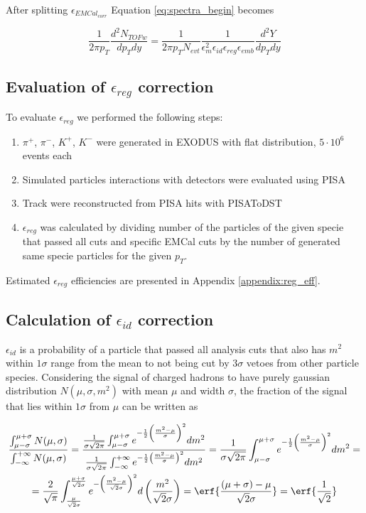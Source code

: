 After splitting $\epsilon_{EMCal_{corr}}$ Equation \ref{eq:spectra_begin} becomes

\begin{equation}
	\frac{1}{2\pi p_T}\frac{d^2N_{TOFw}}{dp_T dy} = \frac{1}{2 \pi p_T N_{evt}}\frac{1}{\epsilon_m^{2}\epsilon_{id}\epsilon_{reg}\epsilon_{emb}}\frac{d^2Y}{dp_T dy}
	\label{eq:spectra}
\end{equation}

\subsection{Evaluation of $\epsilon_{reg}$ correction}

To evaluate $\epsilon_{reg}$ we performed the following steps:
\begin{enumerate}
	\item $\pi^+$, $\pi^-$, $K^+$, $K^-$ were generated in EXODUS with flat distribution, $5 \cdot 10^6$ events each
	\item Simulated particles interactions with detectors were evaluated using PISA
	\item Track were reconstructed from PISA hits with PISAToDST
	\item $\epsilon_{reg}$ was calculated by dividing number of the particles of the given specie that passed all cuts and specific EMCal cuts by the number of generated same specie particles for the given $p_T$.
\end{enumerate}

Estimated $\epsilon_{reg}$ efficiencies are presented in Appendix \ref{appendix:reg_eff}.

\subsection{Calculation of $\epsilon_{id}$ correction}

$\epsilon_{id}$ is a probability of a particle that passed all analysis cuts that also has $m^2$ within $1\sigma$ range from the mean to not being cut by $3\sigma$ vetoes from other particle species. Considering the signal of charged hadrons to have purely gaussian distribution $N(\mu, \sigma, m^2)$ with mean $\mu$ and width $\sigma$, the fraction of the signal that lies within $1\sigma$ from $\mu$ can be written as

\begin{multline}
	\frac{\int_{\mu - \sigma}^{\mu + \sigma} N(\mu, \sigma)}{\int_{-\infty}^{+\infty} N(\mu, \sigma)} = 
	\frac{\frac{1}{\sigma \sqrt{2 \pi}} \int_{\mu - \sigma}^{\mu + \sigma} e^{-\frac{1}{2} \left( \frac{m^2-\mu}{\sigma} \right)^2} dm^2}
	{\frac{1}{\sigma \sqrt{2 \pi}} \int_{-\infty}^{+\infty} e^{-\frac{1}{2} \left( \frac{m^2-\mu}{\sigma} \right)^2} dm^2} = 
	\frac{1}{\sigma \sqrt{2 \pi}}\int_{\mu - \sigma}^{\mu + \sigma} e^{-\frac{1}{2} \left( \frac{m^2-\mu}{\sigma} \right)^2} d m^2 = \\
	= \frac{2}{\sqrt{\pi}}\int_{\frac{\mu}{\sqrt{2}\sigma}}^{\frac{\mu + \sigma}{\sqrt{2}\sigma}} e^{-\left( \frac{m^2-\mu}{\sqrt{2}\sigma} \right)^2} d \left( \frac{m^2}{\sqrt{2}\sigma} \right) = 
	\erf{\frac{(\mu + \sigma) - \mu}{\sqrt{2}\sigma}} = \erf{\frac{1}{\sqrt{2}}}
\end{multline}

